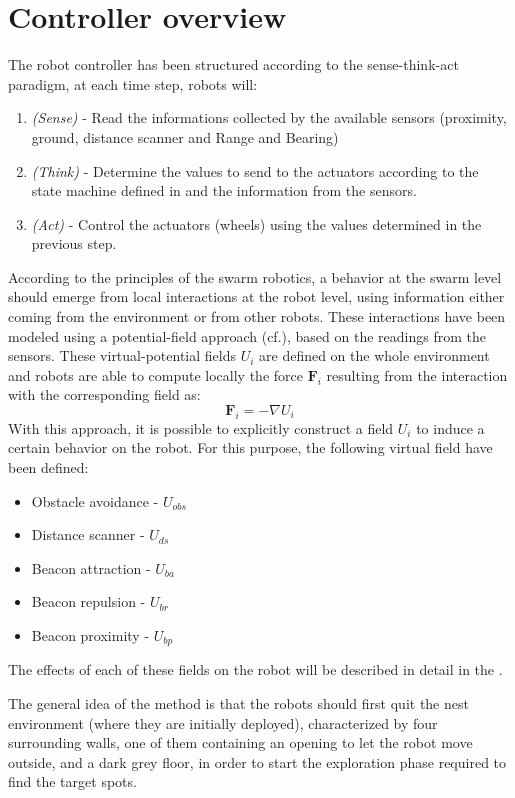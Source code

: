 \section{Controller overview}

The robot controller has been structured according to the sense-think-act paradigm, at each time step, robots will:
\begin{enumerate}
  \item \emph{(Sense)} - Read the informations collected by the available sensors (proximity, ground, distance scanner and Range and Bearing)
  \item \emph{(Think)} - Determine the values to send to the actuators according to the state machine defined in  and the information from the sensors.
  \item \emph{(Act)} - Control the actuators (wheels) using the values determined in the previous step.
\end{enumerate}

According to the principles of the swarm robotics, a behavior at the swarm level should emerge from local interactions at the robot level, using information either coming from the environment or from other robots.
These interactions have been modeled using a potential-field approach (cf.\cite{howard2002mobile}), based on the readings from the sensors.
These virtual-potential fields $U_i$ are defined on the whole environment and robots are able to compute locally the force $\mathbf{F}_i$ resulting from the interaction with the corresponding field as:
\begin{equation}
  \mathbf{F}_i = -\nabla U_i
\end{equation}
With this approach, it is possible to explicitly construct a field $U_i$ to induce a certain behavior on the robot.
For this purpose, the following virtual field have been defined:
\begin{itemize}
  \item Obstacle avoidance - $U_{obs}$
  \item Distance scanner - $U_{ds}$
  \item Beacon attraction - $U_{ba}$
  \item Beacon repulsion - $U_{br}$
  \item Beacon proximity - $U_{bp}$
\end{itemize} 

The effects of each of these fields on the robot will be described in detail in the .

The general idea of the method is that the robots should first quit the nest environment (where they are initially deployed), characterized by four surrounding walls, one of them containing an opening to let the robot move outside, and a dark grey floor, in order to start the exploration phase required to find the target spots.

